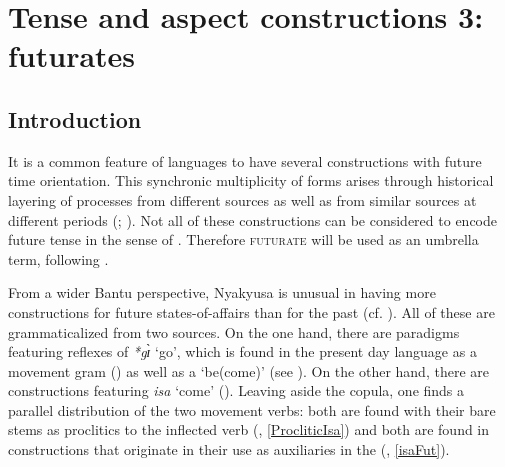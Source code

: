 \chapter{Tense and aspect constructions 3: futurates}
\label{Futurates} 
\section{Introduction}
It is a common feature of languages to have several constructions with future time orientation. This synchronic multiplicity of forms arises through historical layering of  processes from different sources as well as from similar sources at different periods (\citealt{BybeePagliucaPerkins1991}; \citealt{BybeePerkinsPaglucia1994}). Not all of these constructions can be considered to encode future tense in the sense of . Therefore \textsc{futurate} will be used as an umbrella term, following \citet{BinnickR1991}.

From a wider Bantu perspective, Nyakyusa is unusual in having more constructions for future states-of-affairs than for the past (cf. \citealt[89]{NurseD2008}). All of these are grammaticalized from two sources. On the one hand, there are paradigms featuring reflexes of  \textit{*gɪ̀} \lq go', which is found in the present day language as a movement gram () as well as a  \lq be(come)' (see  ). On the other hand, there are constructions featuring \textit{isa} \lq come' (). Leaving aside the copula, one finds a parallel distribution of the two movement verbs: both are found with their bare stems as proclitics to the inflected verb (, \ref{ProcliticIsa}) and both are found in constructions that originate in their use as auxiliaries in the  (, \ref{isaFut}).

